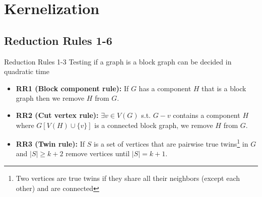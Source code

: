 \documentclass{beamer}
\begin{document}
\section{Kernelization}
\subsection{Reduction Rules 1-6}
\begin{frame}{Reduction Rules 1-3}
    Testing if a graph is a block graph can be decided in quadratic time~\cite{hopcroft_algorithm_1973}
    \vspace{-5pt}
    \begin{itemize}[<+->]
        \item \textbf{RR1 (Block component rule):} If \(G\) has a component \(H\) that is a block graph then we remove \(H\) from \(G\).
        \item \textbf{RR2 (Cut vertex rule):} \(\exists v\in V(G)\) s.t. \(G - v\) contains a component \(H\) where \(G[V(H) \cup \{v\}]\) is a connected block graph, we remove \(H\) from \(G\).
        \item \textbf{RR3 (Twin rule):} If \(S\) is a set of vertices that are pairwise true twins\footnote{Two vertices are true twins if they share all their neighbors (except each other) and are connected} in \(G\) and \(|S| \geq k+2\) remove vertices until \(|S| = k+1\).
    \end{itemize}
    
\end{frame}
\end{document}

